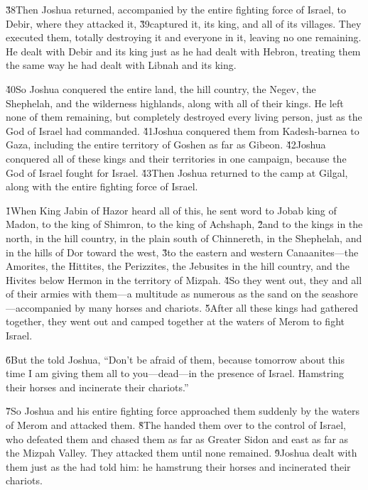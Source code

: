 \v{38}Then Joshua returned, accompanied by the entire fighting force of Israel, to Debir, where they attacked it, \v{39}captured it, its king, and all of its villages. They executed them, totally destroying it and everyone in it, leaving no one remaining. He dealt with Debir and its king just as he had dealt with Hebron, treating them the same way he had dealt with Libnah and its king.

\v{40}So Joshua conquered the entire land, the hill country, the Negev, the Shephelah, and the wilderness highlands, along with all of their kings. He left none of them remaining, but completely destroyed every living person, just as the  God of Israel had commanded. \v{41}Joshua conquered them from Kadesh-barnea to Gaza, including the entire territory of Goshen as far as Gibeon. \v{42}Joshua conquered all of these kings and their territories in one campaign, because the  God of Israel fought for Israel. \v{43}Then Joshua returned to the camp at Gilgal, along with the entire fighting force of Israel.

\v{1}When King Jabin of Hazor heard all of this, he sent word to Jobab king of Madon, to the king of Shimron, to the king of Achshaph, \v{2}and to the kings in the north, in the hill country, in the plain south of Chinnereth, in the Shephelah, and in the hills of Dor toward the west, \v{3}to the eastern and western Canaanites---the Amorites, the Hittites, the Perizzites, the Jebusites in the hill country, and the Hivites below Hermon in the territory of Mizpah. \v{4}So they went out, they and all of their armies with them---a multitude as numerous as the sand on the seashore---accompanied by many horses and chariots. \v{5}After all these kings had gathered together, they went out and camped together at the waters of Merom to fight Israel.

\v{6}But the  told Joshua, ``Don't be afraid of them, because tomorrow about this time I am giving them all to you---dead---in the presence of Israel. Hamstring their horses and incinerate their chariots.''

\v{7}So Joshua and his entire fighting force approached them suddenly by the waters of Merom and attacked them. \v{8}The  handed them over to the control of Israel, who defeated them and chased them as far as Greater Sidon and east as far as the Mizpah Valley. They attacked them until none remained. \v{9}Joshua dealt with them just as the  had told him: he hamstrung their horses and incinerated their chariots.

